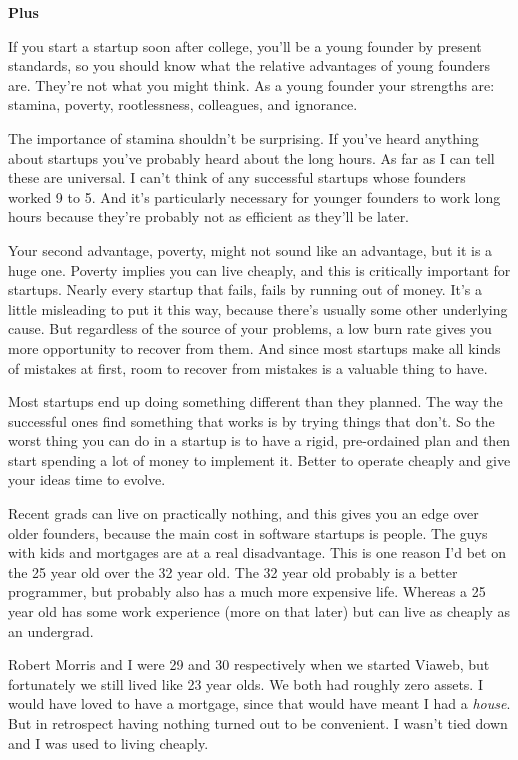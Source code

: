 \documentclass[12pt]{book}
\begin{document}
\textbf{Plus}

If you start a startup soon after college, you'll be a young founder by
present standards, so you should know what the relative advantages of
young founders are. They're not what you might think. As a young founder
your strengths are: stamina, poverty, rootlessness, colleagues, and
ignorance.

The importance of stamina shouldn't be surprising. If you've heard
anything about startups you've probably heard about the long hours. As
far as I can tell these are universal. I can't think of any successful
startups whose founders worked 9 to 5. And it's particularly necessary
for younger founders to work long hours because they're probably not as
efficient as they'll be later.

Your second advantage, poverty, might not sound like an advantage, but
it is a huge one. Poverty implies you can live cheaply, and this is
critically important for startups. Nearly every startup that fails,
fails by running out of money. It's a little misleading to put it this
way, because there's usually some other underlying cause. But regardless
of the source of your problems, a low burn rate gives you more
opportunity to recover from them. And since most startups make all kinds
of mistakes at first, room to recover from mistakes is a valuable thing
to have.

Most startups end up doing something different than they planned. The
way the successful ones find something that works is by trying things
that don't. So the worst thing you can do in a startup is to have a
rigid, pre-ordained plan and then start spending a lot of money to
implement it. Better to operate cheaply and give your ideas time to
evolve.

Recent grads can live on practically nothing, and this gives you an edge
over older founders, because the main cost in software startups is
people. The guys with kids and mortgages are at a real disadvantage.
This is one reason I'd bet on the 25 year old over the 32 year old. The
32 year old probably is a better programmer, but probably also has a
much more expensive life. Whereas a 25 year old has some work experience
(more on that later) but can live as cheaply as an undergrad.

Robert Morris and I were 29 and 30 respectively when we started Viaweb,
but fortunately we still lived like 23 year olds. We both had roughly
zero assets. I would have loved to have a mortgage, since that would
have meant I had a \emph{house}. But in retrospect having nothing turned
out to be convenient. I wasn't tied down and I was used to living
cheaply.
\end{document}
